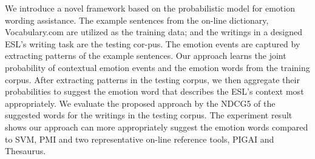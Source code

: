 We introduce a novel framework based on the probabilistic model for emotion wording assistance. The example sentences from the on-line dictionary, Vocabulary.com are utilized as the training data; and the writings in a designed ESL's writing task are the testing cor-pus. The emotion events are captured by extracting patterns of the example sentences. Our approach learns the joint probability of contextual emotion events and the emotion words from the training corpus. After extracting patterns in the testing corpus, we then aggregate their probabilities to suggest the emotion word that describes the ESL's context most appropriately. We evaluate the proposed approach by the NDCG\@5 of the suggested words for the writings in the testing corpus. The experiment result shows our approach can more appropriately suggest the emotion words compared to SVM, PMI and two representative on-line reference tools, PIGAI and Thesaurus.

